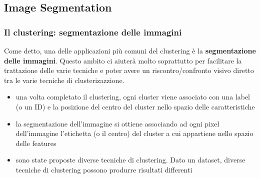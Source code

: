 \subsection[Image Segmentation]{Image Segmentation}
%
%
%
%


\begin{frame}

	\frametitle{Il clustering: segmentazione delle immagini}

		Come detto, una delle applicazioni più comuni del clustering è la \textbf{segmentazione delle immagini}.
		\newlinedouble
		Questo ambito ci aiuterà molto soprattutto per facilitare la trattazione delle varie tecniche e poter avere un riscontro/confronto visivo diretto tra le varie tecniche di clusterizazzione.
		\begin{itemize}
			\item una volta completato il clustering, ogni cluster viene associato con una label (o un ID) e la posizione del centro del cluster nello spazio delle caratteristiche
			\item la segmentazione dell'immagine si ottiene associando ad ogni pixel dell'immagine l'etichetta (o il centro) del cluster a cui appartiene nello spazio delle features
			\item sono state proposte diverse tecniche di clustering. Dato un dataset, diverse tecniche di clustering possono produrre risultati differenti
		\end{itemize}

\end{frame}


